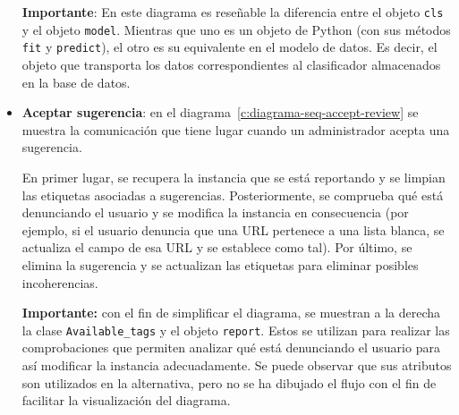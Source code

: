 \begin{itemize}
	\textbf{Importante}: En este diagrama es reseñable la diferencia entre el objeto \texttt{cls} y el objeto \texttt{model}. Mientras que uno es un objeto de Python (con sus métodos \texttt{fit} y \texttt{predict}), el otro es su equivalente en el modelo de datos. Es decir, el objeto que transporta los datos correspondientes al clasificador almacenados en la base de datos.
			
	\item \textbf{Aceptar sugerencia}: en el diagrama~\ref{c:diagrama-seq-accept-review} se muestra la comunicación que tiene lugar cuando un administrador acepta una sugerencia.
	
	En primer lugar, se recupera la instancia que se está reportando y se limpian las etiquetas asociadas a sugerencias. Posteriormente, se comprueba qué está denunciando el usuario y se modifica la instancia en consecuencia (por ejemplo, si el usuario denuncia que una URL pertenece a una lista blanca, se actualiza el campo de esa URL y se establece como tal). Por último, se elimina la sugerencia y se actualizan las etiquetas para eliminar posibles incoherencias.
	
	\textbf{Importante:} con el fin de simplificar el diagrama, se muestran a la derecha la clase \texttt{Available\_tags} y el objeto \texttt{report}. Estos se utilizan para realizar las comprobaciones que permiten analizar qué está denunciando el usuario para así modificar la instancia adecuadamente. Se puede observar que sus atributos son utilizados en la alternativa, pero no se ha dibujado el flujo con el fin de facilitar la visualización del diagrama.
	
	
	
\end{itemize}

